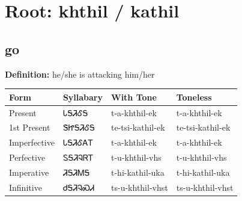 \documentclass{article}%
\begin{document}
%
\normalsize%
\section*{Root: khthil / kathil}%
\subsection*{go}%
\textbf{Definition: }%
he/she is attacking him/her%
\\[0.5em]%
\begin{tabular}{|l|l|l|l|}%
\hline%
\textbf{Form}&\textbf{Syllabary}&\textbf{With Tone}&\textbf{Toneless}\\%
\hline%
Present&ᏓᎦᏘᎴᎦ&t{-}a{-}khthil{-}ek&t{-}a{-}khthil{-}ek\\%
1st Present&ᏕᏥᎦᏘᎴᎦ&te{-}tsi{-}kathil{-}ek&te{-}tsi{-}kathil{-}ek\\%
Imperfective&ᏓᎦᏘᎴᎪᎢ&t{-}a{-}khthil{-}ek&t{-}a{-}khthil{-}ek\\%
Perfective&ᏚᎦᏘᎸᏒᎢ&t{-}u{-}khthil{-}vhs&t{-}u{-}khthil{-}vhs\\%
Imperative&ᏘᎦᏘᎷᎦ&t{-}hi{-}kathil{-}uka&t{-}hi{-}kathil{-}uka\\%
Infinitive&ᏧᎦᏘᎸᏍᏗ&ts{-}u{-}khthil{-}vhst&ts{-}u{-}khthil{-}vhst\\%
\hline%
\end{tabular}%
\\[1em]%
\end{document}
